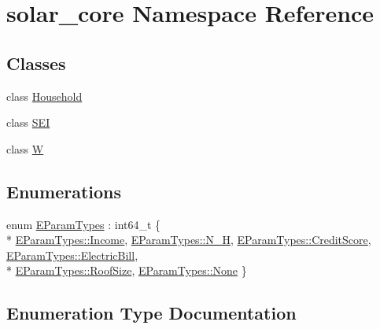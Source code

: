 \hypertarget{namespacesolar__core}{}\section{solar\+\_\+core Namespace Reference}
\label{namespacesolar__core}
\subsection*{Classes}
\begin{DoxyCompactItemize}
\item 
class \hyperlink{classsolar__core_1_1_household}{Household}
\item 
class \hyperlink{classsolar__core_1_1_s_e_i}{S\+E\+I}
\item 
class \hyperlink{classsolar__core_1_1_w}{W}
\end{DoxyCompactItemize}
\subsection*{Enumerations}
\begin{DoxyCompactItemize}
\item 
enum \hyperlink{namespacesolar__core_aa1147341e5ef7a40d68d1bd68e149362}{E\+Param\+Types} \+: int64\+\_\+t \{ \\*
\hyperlink{namespacesolar__core_aa1147341e5ef7a40d68d1bd68e149362a1f08d08fd864b99cbeebd88b9a0784a7}{E\+Param\+Types\+::\+Income}, 
\hyperlink{namespacesolar__core_aa1147341e5ef7a40d68d1bd68e149362a62c5cc90270449db38e6fb4f2db71c55}{E\+Param\+Types\+::\+N\+\_\+\+H}, 
\hyperlink{namespacesolar__core_aa1147341e5ef7a40d68d1bd68e149362a417bef7b89fce8abf638b9983a79a70e}{E\+Param\+Types\+::\+Credit\+Score}, 
\hyperlink{namespacesolar__core_aa1147341e5ef7a40d68d1bd68e149362a2260b5ee8e87a0db64c77e42a574c858}{E\+Param\+Types\+::\+Electric\+Bill}, 
\\*
\hyperlink{namespacesolar__core_aa1147341e5ef7a40d68d1bd68e149362a2bf6593af19bb602f7c596d7327c6dd6}{E\+Param\+Types\+::\+Roof\+Size}, 
\hyperlink{namespacesolar__core_aa1147341e5ef7a40d68d1bd68e149362a6adf97f83acf6453d4a6a4b1070f3754}{E\+Param\+Types\+::\+None}
 \}
\end{DoxyCompactItemize}


\subsection{Enumeration Type Documentation}
\hypertarget{namespacesolar__core_aa1147341e5ef7a40d68d1bd68e149362}{}

